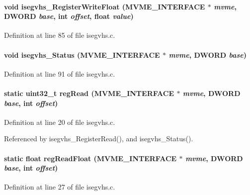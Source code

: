 \paragraph[{isegvhs\_\-RegisterWriteFloat}]{\setlength{\rightskip}{0pt plus 5cm}void isegvhs\_\-RegisterWriteFloat ({\bf MVME\_\-INTERFACE} $\ast$ {\em mvme}, \/  {\bf DWORD} {\em base}, \/  int {\em offset}, \/  float {\em value})}\hfill\label{isegvhs_8c_af4c3b3ae7b017ef10521d9c1e2f8b38f}


Definition at line 85 of file isegvhs.c.
\paragraph[{isegvhs\_\-Status}]{\setlength{\rightskip}{0pt plus 5cm}void isegvhs\_\-Status ({\bf MVME\_\-INTERFACE} $\ast$ {\em mvme}, \/  {\bf DWORD} {\em base})}\hfill\label{isegvhs_8c_a2ba6c21fb7b196351e5294280e7662d2}


Definition at line 91 of file isegvhs.c.
\paragraph[{regRead}]{\setlength{\rightskip}{0pt plus 5cm}static uint32\_\-t regRead ({\bf MVME\_\-INTERFACE} $\ast$ {\em mvme}, \/  {\bf DWORD} {\em base}, \/  int {\em offset})}\hfill\label{isegvhs_8c_ae725ca307cd6f4fdfdd5476249d31e59}


Definition at line 20 of file isegvhs.c.

Referenced by isegvhs\_\-RegisterRead(), and isegvhs\_\-Status().
\paragraph[{regReadFloat}]{\setlength{\rightskip}{0pt plus 5cm}static float regReadFloat ({\bf MVME\_\-INTERFACE} $\ast$ {\em mvme}, \/  {\bf DWORD} {\em base}, \/  int {\em offset})}\hfill\label{isegvhs_8c_a0185c3c44dc8262161d9cbae5960ebc4}


Definition at line 27 of file isegvhs.c.


